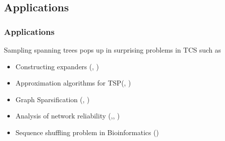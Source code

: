 \documentclass{beamer}
\begin{document}
\subsection{Applications}

\begin{frame}

\frametitle{Applications}
 
Sampling spanning trees pops up in surprising problems in TCS such as 

\begin{itemize}
\pause
\item Constructing expanders (\cite{10.5555/1496770.1496834}, \cite{doi:10.1137/120890971})
\pause
\item Approximation algorithms for TSP(\cite{6108216}, \cite{doi:10.1287/opre.2017.1603})
\pause
\item Graph Sparsification (\cite{DBLP:journals/corr/abs-1005-0265}, \cite{dolev2016random})
\pause
\item Analysis of network reliability (\cite{10.5555/535891},\cite{doi:10.1002/net.3230200303}, \cite{colbourn1988estimating})
\pause
\item Sequence shuffling problem in Bioinformatics (\cite{KANDEL1996171})

\end{itemize}

{}





% 



\end{frame}

\end{document}
